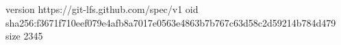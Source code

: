 version https://git-lfs.github.com/spec/v1
oid sha256:f3671f710eef079e4afb8a7017e0563e4863b7b767c63d58c2d59214b784d479
size 2345
